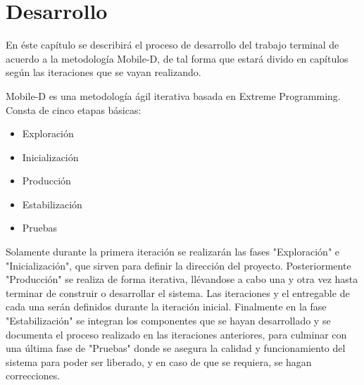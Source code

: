 \chapter{Desarrollo}

En éste capítulo se describirá el proceso de desarrollo del trabajo terminal de acuerdo a la metodología Mobile-D, de tal forma que estará divido en capítulos según las iteraciones que se vayan realizando.\par
Mobile-D es una metodología ágil iterativa basada en Extreme Programming. Consta de cinco etapas básicas: 
\begin{itemize}
	\item Exploración
	\item Inicialización
	\item Producción
	\item Estabilización
	\item Pruebas
\end{itemize}
\noindent
Solamente durante la primera iteración se realizarán las fases "Exploración" e "Inicialización", que sirven para definir la dirección del proyecto. Posteriormente "Producción" se realiza de forma iterativa, llévandose a cabo una y otra vez hasta terminar de construir o desarrollar el sistema. Las iteraciones y el entregable de cada una serán definidos durante la iteración inicial.
Finalmente en la fase "Estabilización" se integran los componentes que se hayan desarrollado y se documenta el proceso realizado en las iteraciones anteriores, para culminar con una última fase de "Pruebas" donde se asegura la calidad y funcionamiento del sistema para poder ser liberado, y en caso de que se requiera, se hagan correcciones.